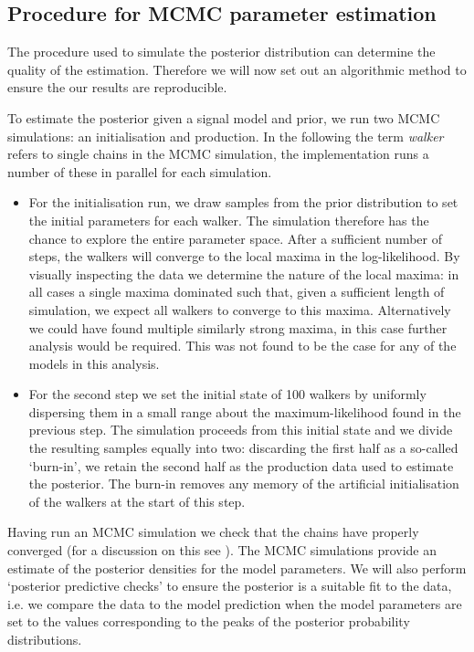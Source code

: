 \documentclass[../full_thesis/full_thesis.tex]{subfiles}
\begin{document}
\begin{subappendices}
\section{Procedure for MCMC parameter estimation}
\label{sec: procedure for the mcmc parameter estimation}

The procedure used to simulate the posterior distribution can determine the
quality of the estimation. Therefore we will now set out an algorithmic method
to ensure the our results are reproducible.

To estimate the posterior given a signal model and prior, we run two MCMC
simulations: an initialisation and production. In the following the term
\emph{walker} refers to single chains in the MCMC simulation, the
\citet{Foreman-Mackay2013} implementation runs a number of these in parallel
for each simulation.

\begin{itemize}

\item For the initialisation run, we draw samples from the prior distribution
to set the initial parameters for each walker. The simulation therefore has the
chance to explore the entire parameter space. After a sufficient number of
steps, the walkers will converge to the local maxima in the log-likelihood. By
visually inspecting the data we determine the nature of the local maxima: in
all cases a single maxima dominated such that, given a sufficient length of
simulation, we expect all walkers to converge to this maxima. Alternatively we
could have found multiple similarly strong maxima, in this case further
analysis would be required. This was not found to be the case for any of the
models in this analysis.

\item For the second step we set the initial state of 100 walkers by uniformly
dispersing them in a small range about the maximum-likelihood found in the
previous step. The simulation proceeds from this initial state and we divide
the resulting samples equally into two: discarding the first half as a
so-called `burn-in', we retain the second half as the production data used to
estimate the posterior.  The burn-in removes any memory of the artificial
initialisation of the walkers at the start of this step.

\end{itemize}

Having run an MCMC simulation we check that the chains have properly converged
(for a discussion on this see \citet{gelman2013bayesian}).  The MCMC
simulations provide an estimate of the posterior densities for the model
parameters. We will also perform `posterior predictive checks' to ensure the
posterior is a suitable fit to the data, i.e. we compare the data to the model
prediction when the model parameters are set to the values corresponding to the
peaks of the posterior probability  distributions.


\end{subappendices}
\end{document}
